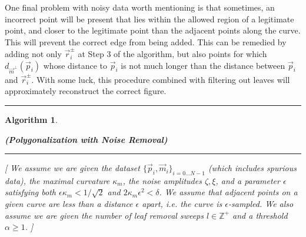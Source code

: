 \documentclass{article}
\newtheorem{algo}{Algorithm}
\numberwithin{cntr}{section}
\numberwithin{equation}{section}
\newcommand{\vp}[0]{{\vec{p}}}
\newcommand{\vr}[0]{{\vec{r}}}
\newcommand{\vm}[0]{{\vec{m}}}
\newcommand{\OtoN}{{0 \ldots N-1}}
\newcommand{\allData}{{ \{ \vp_{i}, \vm_{i} \}_{i=\OtoN} }}
\newcommand{\curvemax}{{\kappa_{m}}}
\newcommand{\curvesep}{{\delta}}
\newcommand{\pointNoise}{{\zeta}}
\newcommand{\tanNoise}{{\xi}}
\begin{document}
One final problem with noisy data worth mentioning is that sometimes,
an incorrect point will be present that lies within the allowed
region of a legitimate point, and closer to the legitimate point
than the adjacent points along the curve. This will prevent the
correct edge from being added. This can be remedied by adding not
only $\vr_{i}^{\pm}$ at Step 3 of the algorithm, but also points for
which $d_{\vm^{\perp}}(\vp_{i})$ whose distance to $\vp_{i}$ is not
much longer than the distance between $\vp_{i}$ and $\vr_{i}^{\pm}$.
With some luck, this procedure combined with filtering out leaves
will approximately reconstruct the correct figure.

\vspace{.2in}

\hrule
\begin{algo}
  \label{algo:noisyPolygonalization}
  \begin{center}
  {\bf (Polygonalization with Noise Removal)}
  \end{center}

\vspace{.1in}

\hrule

\vspace{.2in}


[ We assume we are given the dataset $\allData$ (which includes spurious data),
the maximal curvature
$\curvemax$, the noise amplitudes $\pointNoise, \tanNoise$, and a
parameter $\epsilon$ satisfying both $\epsilon \curvemax < 1/\sqrt{2}$ and
$2 \curvemax \epsilon^{2} < \curvesep$.
We assume that adjacent points on a given curve
are less than a distance $\epsilon$ apart, i.e. the curve is
$\epsilon$-sampled. We also assume we are given the number of
leaf removal sweeps $l \in \mathbb{Z}^{+}$ and a
threshold $\alpha \geq 1$. ]

\vspace{.1in}


\end{algo}
\end{document}
